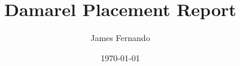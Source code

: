 \documentclass[a4paper,12pt]{scrartcl}
\title{Damarel Placement Report}
\author{James Fernando}
\date{\today}
\begin{document}
	
	\begin{titlepage}
		\maketitle
	\end{titlepage}
	
	\tableofcontents
	\newpage
	
	
	
	
	
	
	
	
	
	
	
	
	
	\newpage
	
	\printbibliography
	\newpage
	
	\begin{appendices}
	
	\end{appendices}
\end{document}
